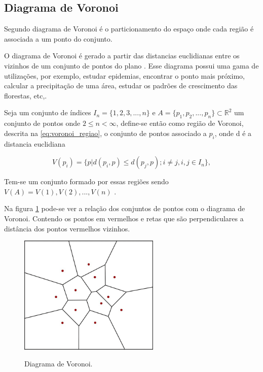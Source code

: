 \subsection{Diagrama de Voronoi}
\label{subsec:diagrama_de_voronoi}

Segundo  diagrama de Voronoi é o particionamento do espaço onde cada região é associada a um ponto do conjunto.

O diagrama de Voronoi é gerado a partir das distancias euclidianas entre os vizinhos de um conjunto de pontos do plano\space
\cite{diagrama_de_voronoi:_uma_exploracao_nas_distancias_euclidiana_e_do_taxi}. Esse diagrama possui uma gama de utilizações, por exemplo, estudar epidemias, encontrar o
ponto mais próximo, calcular a precipitação de uma área, estudar os padrões de crescimento das florestas, etc,\space\cite{poligonos_de_thiessen_ou_voronoi}.

Seja um conjunto de índices $I_n = \{1, 2, 3, ..., n\}$ e $A = \{p_1, p_2, ..., p_n\} \subset \mathbb{R}^2$ um conjunto de pontos onde $2 \leq n < \infty$, define-se então como região de Voronoi, descrita na \cref{eq:voronoi_regiao}, o conjunto de pontos associado a $p_i$, onde d é a distancia euclidiana

\begin{equation}
	\label{eq:voronoi_regiao}
	V(p_i) = \{p|d(p_i,p) \leq d(p_j,p);i \neq j, i, j \in I_n\},
\end{equation}

Tem-se um conjunto formado por essas regiões sendo $V(A) = {V(1), V(2), ..., V(n)}$ \space\cite{rodrigues_diagrama_2019}.

Na figura \cref{fig:diagrama_voronoi} pode-se ver a relação dos conjuntos de pontos com o diagrama de Voronoi. Contendo os pontos em vermelhos e retas que são perpendiculares a distância dos pontos vermelhos vizinhos.

\begin{figure}[ht]
	\centering
	\caption{Diagrama de Voronoi.}
	\includegraphics[width=0.6\textwidth]{figures/diagrama_voronoi.png}
	\label{fig:diagrama_voronoi}
\end{figure}
